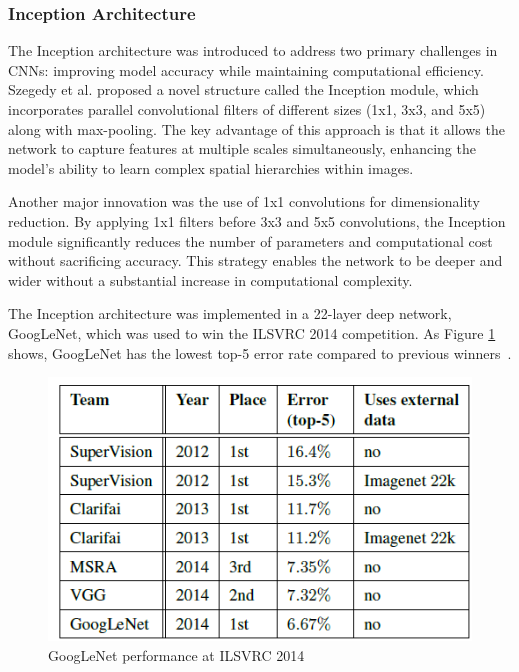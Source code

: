 \documentclass{article}
\begin{document}
\subsubsection{Inception Architecture}
The Inception architecture was introduced to address two primary challenges in CNNs: improving model accuracy while maintaining computational efficiency. Szegedy et al. proposed a novel structure called the Inception module, which incorporates parallel convolutional filters of different sizes (1x1, 3x3, and 5x5) along with max-pooling. The key advantage of this approach is that it allows the network to capture features at multiple scales simultaneously, enhancing the model's ability to learn complex spatial hierarchies within images.

Another major innovation was the use of 1x1 convolutions for dimensionality reduction. By applying 1x1 filters before 3x3 and 5x5 convolutions, the Inception module significantly reduces the number of parameters and computational cost without sacrificing accuracy. This strategy enables the network to be deeper and wider without a substantial increase in computational complexity.

The Inception architecture was implemented in a 22-layer deep network, GoogLeNet, which was used to win the ILSVRC 2014 competition. As Figure \ref{fig:googlenet-comp-perf} shows, GoogLeNet has the lowest top-5 error rate compared to previous winners~\cite{szegedy2015going}.

\begin{figure}[ht]
    \centering
    \includegraphics[scale=0.7]{project/paper_images/googlenet_competition_perf.png}
    \caption{GoogLeNet performance at ILSVRC 2014}
    \label{fig:googlenet-comp-perf}
\end{figure}
\end{document}
